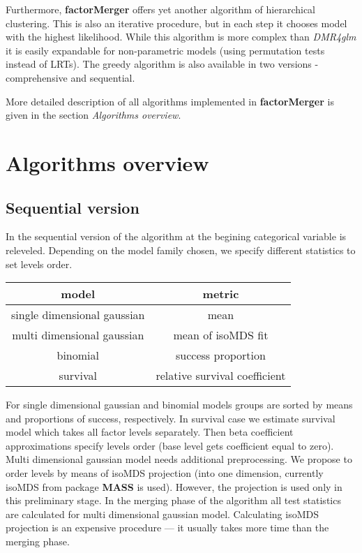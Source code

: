 \documentclass[11pt,]{article}
\begin{document}
Furthermore, \textbf{factorMerger} offers yet another algorithm of
hierarchical clustering. This is also an iterative procedure, but in
each step it chooses model with the highest likelihood. While this
algorithm is more complex than \emph{DMR4glm} it is easily expandable
for non-parametric models (using permutation tests instead of LRTs). The
greedy algorithm is also available in two versions - comprehensive and
sequential.

More detailed description of all algorithms implemented in
\textbf{factorMerger} is given in the section \emph{Algorithms
overview}.

\section{Algorithms overview}\label{algorithms-overview}

\subsection{Sequential version}\label{sequential-version}

In the sequential version of the algorithm at the begining categorical
variable is releveled. Depending on the model family chosen, we specify
different statistics to set levels order.

\begin{longtable}[]{@{}cc@{}}
\toprule
model & metric\tabularnewline
\midrule
\endhead
single dimensional gaussian & mean\tabularnewline
multi dimensional gaussian & mean of isoMDS fit\tabularnewline
binomial & success proportion\tabularnewline
survival & relative survival coefficient\tabularnewline
\bottomrule
\end{longtable}

For single dimensional gaussian and binomial models groups are sorted by
means and proportions of success, respectively. In survival case we
estimate survival model which takes all factor levels separately. Then
beta coefficient approximations specify levels order (base level gets
coefficient equal to zero). Multi dimensional gaussian model needs
additional preprocessing. We propose to order levels by means of isoMDS
projection (into one dimension, currently isoMDS from package
\textbf{MASS} is used). However, the projection is used only in this
preliminary stage. In the merging phase of the algorithm all test
statistics are calculated for multi dimensional gaussian model.
Calculating isoMDS projection is an expensive procedure --- it usually
takes more time than the merging phase.
\end{document}
